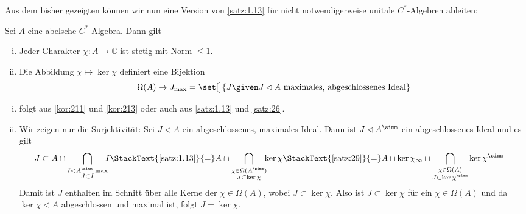 Aus dem bisher gezeigten können wir nun eine Version von \autoref{satz:1.13} für nicht notwendigerweise unitale $C^*$-Algebren ableiten: 

\begin{korollar}[{name=[Stetigkeit von Charakteren und Zusammenhang mit maximalen Idealen]}]
	Sei $A$ eine abelsche $C^*$-Algebra. Dann gilt
	\begin{enumerate}[(i),itemsep=0pt]
		\item Jeder Charakter $\chi \colon A \to \mathbb{C}$ ist stetig mit Norm $\le 1$.
		\item Die Abbildung $\chi \mapsto \ker \chi$ definiert eine Bijektion 
		\[
			\Omega(A) \to J_{\max} = \set[\big]{J \given J \lhd A \text{ maximales, abgeschlossenes Ideal}}
		\]
	\end{enumerate}
\end{korollar}
\begin{beweis}
	\leavevmode
	\begin{enumerate}[(i),itemsep=0pt]
		\item folgt aus \autoref{kor:211} und \autoref{kor:213} oder auch aus \autoref{satz:1.13} und \autoref{satz:26}.
		\item Wir zeigen nur die Surjektivität: Sei $J \lhd A$ ein abgeschlossenes, maximales Ideal. 
		Dann ist $J \lhd A^\simm$ ein abgeschlossenes Ideal und es gilt
		\begin{align}
			J \subset A \cap \bigcap_{\substack{I \lhd A^\simm \text{ max} \\ J \subset I} } \hspace{-1ex} I  
			\StackText{\ref{satz:1.13}}{=} A \cap \bigcap_{\substack{\chi \in \Omega(A^\simm) \\ J \subset \ker \chi}} \hspace{-1ex}\ker \chi 
			&\StackText{\ref{satz:29}}{=} A \cap \ker \chi_\infty \cap \bigcap_{\substack{\chi \in \Omega(A) \\ J \subset \ker \chi^\simm}} \ker \chi^\simm  
		\end{align}
		Damit ist $J$ enthalten im Schnitt über alle Kerne der $\chi \in \Omega(A)$, wobei $J \subset \ker \chi$. 
		Also ist $J \subset \ker \chi$ für ein $\chi \in \Omega(A)$ und da $\ker \chi \lhd A$ abgeschlossen und maximal ist, folgt $J=\ker \chi$. \qedhere
	\end{enumerate}
\end{beweis}

